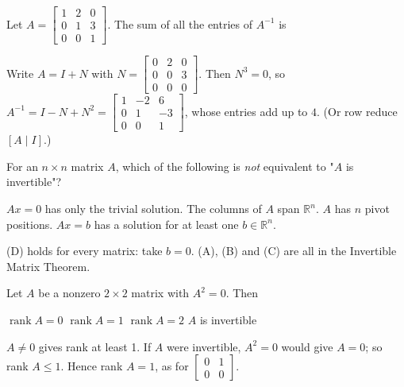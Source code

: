 \begin{question}[id=mat-6, marks=2]
Let $A = \begin{bmatrix} 1 & 2 & 0 \\ 0 & 1 & 3 \\ 0 & 0 & 1 \end{bmatrix}$. The sum of all the entries of $A^{-1}$ is
\begin{solution}
Write $A = I + N$ with $N = \begin{bmatrix} 0 & 2 & 0 \\ 0 & 0 & 3 \\ 0 & 0 & 0 \end{bmatrix}$. Then $N^3 = 0$, so $A^{-1} = I - N + N^2 = \begin{bmatrix} 1 & -2 & 6 \\ 0 & 1 & -3 \\ 0 & 0 & 1 \end{bmatrix}$, whose entries add up to $4$. (Or row reduce $[A \mid I]$.)
\end{solution}
\end{question}

\begin{question}[id=mat-7]
For an $n \times n$ matrix $A$, which of the following is \emph{not} equivalent to "$A$ is invertible"?
\begin{options}
  \option $Ax = 0$ has only the trivial solution.
  \option The columns of $A$ span $\mathbb{R}^n$.
  \option $A$ has $n$ pivot positions.
  \correct $Ax = b$ has a solution for at least one $b \in \mathbb{R}^n$.
\end{options}
\begin{solution}
(D) holds for every matrix: take $b = 0$. (A), (B) and (C) are all in the Invertible Matrix Theorem.
\end{solution}
\end{question}

\begin{question}[id=mat-8, marks=2]
Let $A$ be a nonzero $2 \times 2$ matrix with $A^2 = 0$. Then
\begin{options}
  \option $\operatorname{rank} A = 0$
  \correct $\operatorname{rank} A = 1$
  \option $\operatorname{rank} A = 2$
  \option $A$ is invertible
\end{options}
\begin{solution}
$A \ne 0$ gives rank at least 1. If $A$ were invertible, $A^2 = 0$ would give $A = 0$; so rank $A \le 1$. Hence rank $A = 1$, as for $\begin{bmatrix} 0 & 1 \\ 0 & 0 \end{bmatrix}$.
\end{solution}
\end{question}

